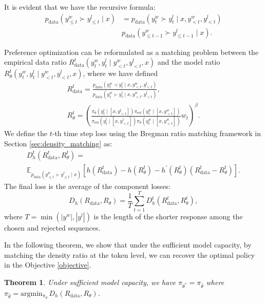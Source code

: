 \documentclass{article}
\theoremstyle{plain}
\newtheorem{theorem}{Theorem}[section]
\theoremstyle{definition}
\theoremstyle{remark}
\begin{document}
It is evident that we have the recursive formula:
\begin{align}
p_{\text{data}}\left(y_{\leq t}^{w}\succ y_{\leq t}^{l}\mid x\right) & =p_{\text{data}}\left(y_{t}^{w}\succ y_{t}^{l}\mid x,y_{<t}^{w},y_{<t}^{l}\right)\nonumber \\
 & p_{\text{data}}\left(y_{\leq t-1}^{w}\succ y_{\leq t-1}^{l}\mid x\right).\label{eq:recursive}
\end{align}

Preference optimization can be reformulated as a matching problem between the empirical data ratio  
$R^t_{\text{data}}(y^w_t, y^l_t \mid y^w_{<t}, y^l_{<t}, x)$  
and the model ratio  
$R^t_{\theta}(y^w_t, y^l_t \mid y^w_{<t}, y^l_{<t}, x)$, where we have defined
\begin{gather}
R_{\text{data}}^{t}=\frac{p_\text{data}(y_{t}^{w}\prec y_{t}^{l}\mid x,y_{<t}^{w},y_{<t}^{l})}{p_\text{data}(y_{t}^{w}\succ y_{t}^{l}\mid x,y_{<t}^{w},y_{<t}^{l})},\nonumber \\
R_{\theta}^{t}=\left(\frac{\pi_{\theta}\left(y_{t}^{l}\mid[x,y_{<t}^{l}]\right)\pi_{\mathrm{ref}}\!\left(y_{t}^{w}\mid[x,y_{<t}^{w}]\right)}{\pi_{\mathrm{ref}}\!\left(y_{t}^{l}\mid[x,y_{<t}^{l}]\right)\pi_{\theta}\!\left(y_{t}^{w}\mid[x,y_{<t}^{w}]\right)}w_{t}\right)^{\beta}.\label{eq:token_matching}
\end{gather}
We define the $t$-th time step loss using the Bregman ratio matching framework in Section \ref{sec:density_matching} as:
\footnotesize{
\begin{multline*}
D_{h}^{t}\left(R_{\text{data}}^{t},R_{\theta}^{t}\right)=\\
\mathbb{E}_{p_{\text{data}}\left(y_{\leq t}^{w}\succ y_{\leq t}^{l}\mid x\right)}\left[h\left(R_{\text{data}}^{t}\right)-h\left(R_{\theta}^{t}\right)-h^{'}\left(R_{\theta}^{t}\right)\left(R_{\text{data}}^{t}-R_{\theta}^{t}\right)\right].
\end{multline*}
}
\normalsize
The final loss is the average of the component losses:
\begin{equation}
D_{h}\left(R_{\text{data}},R_{\theta}\right)=\frac{1}{T}\sum_{t=1}^{T}D_{h}^{t}\left(R_{\text{data}}^{t},R_{\theta}^{t}\right),\label{eq:total_loss}
\end{equation}
where $T=\min(|y^w|,|y^l|)$ is the length of the shorter response among the chosen and rejected sequences.

In the following theorem, we show that under the sufficient model capacity, by matching the density ratio at the token level, we can recover the optimal policy in the Objective \ref{objective}.
\begin{theorem}
\label{optimality-theorem}
    Under sufficient model capacity, we have $\pi_{\theta^{*}}=\pi_{\hat{\theta}}$ where $\pi_{\hat{\theta}}=\text{argmin}{}_{\pi_{\theta}}\,D_{h}\left(R_{\text{data}},R_{\theta}\right)$.
\end{theorem}
\end{document}
